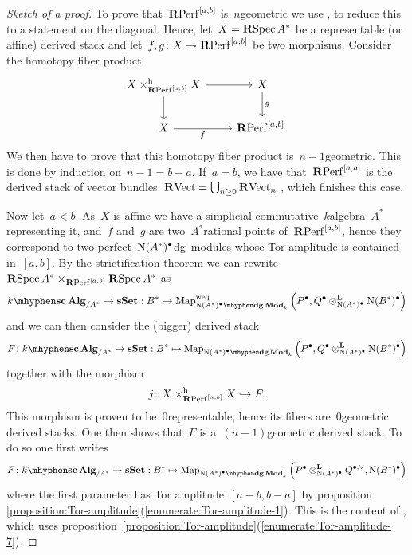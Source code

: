 \begin{refsection}
\begin{theorem}
\begin{proof}[Sketch of a proof]
    To prove that~$\mathbf{R}\mathrm{Perf}^{[a,b]}$ is~$n$\dash geometric we use \cite[lemma 2.18]{toen-vaquie}, to reduce this to a statement on the diagonal. Hence, let~$X=\operatorname{\mathbf{R}\mathrm{Spec}} A^*$ be a representable (or affine) derived stack and let~$f,g\colon X\to\mathbf{R}\mathrm{Perf}^{[a,b]}$ be two morphisms. Consider the homotopy fiber product
    \begin{equation}
      \begin{tikzcd}
        X\times_{\RPerf^{[a,b]}}^{\mathrm{h}}X \arrow{r} \arrow{d} & X \arrow{d}{g} \\
        X \arrow[swap]{r}{f} & \RPerf^{[a,b]}.
      \end{tikzcd}
    \end{equation}
    We then have to prove that this homotopy fiber product is~$n-1$\dash geometric. This is done by induction on~$n-1=b-a$. If~$a=b$, we have that~$\mathbf{R}\mathrm{Perf}^{[a,a]}$ is the derived stack of vector bundles~$\mathbf{R}\mathrm{Vect}=\bigcup_{n\geq 0}\mathbf{R}\mathrm{Vect}_n$ \cite[corollary 1.3.7.4]{hagII}, which finishes this case.

    Now let~$a<b$. As~$X$ is affine we have a simplicial commutative~$k$\dash algebra~$A^*$ representing it, and~$f$ and~$g$ are two~$A^*$\dash rational points of~$\mathbf{R}\mathrm{Perf}^{[a,b]}$, hence they correspond to two perfect~$\operatorname{N}(A^*)^\bullet$\dash dg~modules whose Tor amplitude is contained in~$[a,b]$. By the strictification theorem \cite[appendix B]{hagII} we can rewrite~$\operatorname{\mathbf{R}\mathrm{Spec}} A^*\times_{\mathbf{R}\mathrm{Perf}^{[a,b]}}\operatorname{\mathbf{R}\mathrm{Spec}} A^*$ as
    \begin{equation}
      \scAlg{k}_{/A^*}\to\sSet:B^*\mapsto\Map_{\dgMod{\nerve(A^*)^\bullet}_k}^{\mathrm{weq}}\left( P^\bullet,Q^\bullet\otimes_{\nerve(A^*)^\bullet}^{\mathbf{L}}\nerve(B^*)^\bullet \right)
    \end{equation}
    and we can then consider the (bigger) derived stack
    \begin{equation}
      F\colon\scAlg{k}_{/A^*}\to\sSet:B^*\mapsto\Map_{\dgMod{\nerve(A^*)^\bullet}_k}\left( P^\bullet,Q^\bullet\otimes_{\nerve(A^*)^\bullet}^{\mathbf{L}}\nerve(B^*)^\bullet \right)
    \end{equation}
    together with the morphism
    \begin{equation}
      j\colon X\times_{\mathbf{R}\mathrm{Perf}^{[a,b]}}^{\mathrm{h}}X\hookrightarrow F.
    \end{equation}
    This morphism is proven to be~$0$\dash representable, hence its fibers are~$0$\dash geometric derived stacks. One then shows that~$F$ is a~$(n-1)$\dash geometric derived stack. To do so one first writes
    \begin{equation}
      F\colon\scAlg{k}_{/A^*}\to\sSet:B^*\mapsto\Map_{\dgMod{\nerve(A^*)^\bullet}_k}\left( P^\bullet\otimes_{\nerve(A^*)^\bullet}^{\mathbf{L}}Q^{\bullet,\vee},\nerve(B^*)^\bullet \right)
    \end{equation}
    where the first parameter has Tor amplitude~$[a-b,b-a]$ by proposition \ref{proposition:Tor-amplitude}(\ref{enumerate:Tor-amplitude-1}). This is the content of \cite[sublemma 3.9]{toen-vaquie}, which uses proposition~\ref{proposition:Tor-amplitude}(\ref{enumerate:Tor-amplitude-7}).


\end{proof}
\end{theorem}
\end{refsection}
